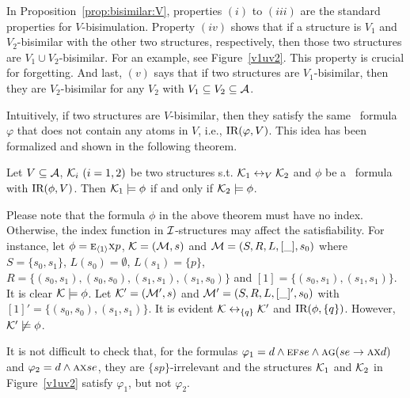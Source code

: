 \documentclass[twoside,11pt]{article}
\begin{document}
In Proposition~\ref{prop:bisimilar:V}, properties $(i)$ to $(iii)$ are the standard properties for $V$-bisimulation.
Property $(iv)$ shows that if a  structure is $V_1$ and $V_2$-bisimilar with the other two structures, respectively, then those two structures are $V_1 \cup V_2$-bisimilar. For an example, see Figure~\ref{v1uv2}. This property is crucial for forgetting.
And last, $(v)$ says that if two  structures are  $V_1$-bisimilar, then they are $V_2$-bisimilar for any $V_2$ with $V_1\subseteq V_2 \subseteq {\cal A}$.






Intuitively, if two structures are $V$-bisimilar, then they satisfy the same \CTL\
formula $\varphi$ that does not contain any atoms in $V$, i.e., $\textrm{IR}(\varphi, V)$. This idea has been formalized and shown in the following theorem.

\begin{theorem}\label{thm:V-bisimulation:EQ}
	Let $V\subseteq\cal A$, ${\cal K}_i~(i=1,2)$ be two structures s.t.
	${\cal K}_1\leftrightarrow_V{\cal K}_2$ and $\phi$ be a \CTL\ formula with $\textrm{IR}(\phi,V)$. Then
	${\cal K}_1\models\phi$ if and only if ${\cal K}_2\models\phi$.
\end{theorem}

Please note that the formula $\phi$ in the above theorem must have no index. Otherwise, the index function
in ${\cal I}$-structures may affect the satisfiability. For instance, let $\phi=\textsc{e}_{{\langle{1}\rangle}}\textsc{x} p$,
${\cal K}=({\cal M},s)$ and ${\cal M}=(S,R,L,[\_],s_0)$ where $S=\{s_0,s_1\}$, $L(s_0)=\emptyset$, $L(s_1)=\{p\}$,
$R=\{(s_0,s_1),(s_0,s_0),(s_1,s_1), (s_1,s_0)\}$ and $[1]=\{(s_0,s_1), (s_1,s_1)\}$. It is clear ${\cal K}\models\phi$.
Let ${\cal K}'=({\cal M}',s)$ and ${\cal M}'=(S,R,L,[\_]',s_0)$ with $[1]'=\{(s_0,s_0),(s_1,s_1)\}$.
It is evident ${\cal K}\leftrightarrow_{\{q\}}{\cal K}'$ and $\textrm{IR}(\phi,\{q\})$. However, ${\cal K}'\not\models\phi$.


It is not difficult to check that, for the formulas  $\varphi_1= d \wedge \textsc{e}\textsc{f} se \wedge \textsc{a}\textsc{g}(se \rightarrow \textsc{a}\textsc{x} d)$
and $\varphi_2= d \wedge \textsc{a} \textsc{x} se$, they are  $\{sp\}$-irrelevant and the structures ${\cal K}_1$ and ${\cal K}_2$ in Figure~\ref{v1uv2} satisfy $\varphi_1$, but not $\varphi_2$.
%
%
\end{document}

